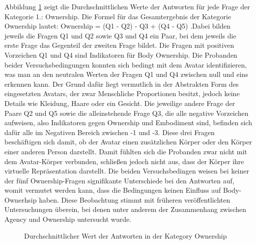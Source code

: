Abbildung \ref{fig:OwnershipScores} zeigt die Durchschnittlichen Werte der Antworten für jede Frage der Kategorie 1.: Ownership. Die Formel für das Gesamtergebnis der Kategorie Ownership lautet: Ownership = (Q1 - Q2) - Q3 + (Q4 - Q5)
 .Dabei bilden jeweils die Fragen Q1 und Q2 sowie Q3 und Q4 ein Paar, bei dem jeweils die erste Frage das Gegenteil der zweiten Frage bildet. Die Fragen mit positiven Vorzeichen Q1 und Q4 sind Indikatoren für Body Ownership. Die Probanden beider Versuchsbedingungen konnten sich bedingt mit dem Avatar identifizieren, was man an den neutralen Werten der Fragen Q1 und Q4 zwischen null und eins erkennen kann. Der Grund dafür liegt vermutlich in der Abstrakten Form des eingesetzten Avatars, der zwar Menschliche Proportionen besitzt, jedoch keine Details wie Kleidung, Haare oder ein Gesicht.
Die jeweilige andere Frage der Paare Q2 und Q5 sowie die alleinstehende Frage Q3, die alle negative Vorzeichen aufweisen, also Indikatoren gegen Ownership und Embodiment sind, befinden sich dafür alle im Negativen Bereich zwischen -1 und -3. Diese drei Fragen beschäftigen sich damit, ob der Avatar einen zusätzlichen Körper oder den Körper einer anderen Person darstellt. Damit fühlten sich die Probanden zwar nicht mit dem Avatar-Körper verbunden, schließen jedoch nicht aus, dass der Körper ihre virtuelle Repräsentation darstellt.
Die beiden Versuchsbedingen weisen bei keiner der fünf Ownership-Fragen signifikante Unterschiede bei den Antworten auf, womit vermutet werden kann, dass die Bedingungen keinen Einfluss auf Body-Ownerhsip haben. Diese Beobachtung stimmt mit früheren veröffentlichten Untersuchungen überein, bei denen unter anderem der Zusammenhang zwischen Agency und Ownership untersucht wurde\cite{Koilias2019}\cite{Kalckert2012}.

\begin{figure}[h]
  \caption[Durchschnittlicher Wert der Antworten in der Kategory Ownership]{Durchschnittlicher Wert der Antworten in der Kategory Ownership}
  \label{fig:OwnershipScores}
\end{figure}



